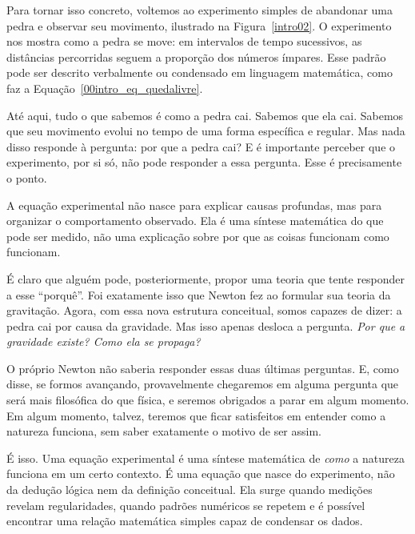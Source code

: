 Para tornar isso concreto, voltemos ao experimento simples de abandonar uma pedra e observar seu movimento, ilustrado na Figura~\ref{intro02}. O experimento nos mostra como a pedra se move: em intervalos de tempo sucessivos, as distâncias percorridas seguem a proporção dos números ímpares. Esse padrão pode ser descrito verbalmente ou condensado em linguagem matemática, como faz a Equação~\eqref{00intro_eq_quedalivre}.

Até aqui, tudo o que sabemos é como a pedra cai. Sabemos que ela cai. Sabemos que seu movimento evolui no tempo de uma forma específica e regular. Mas nada disso responde à pergunta: por que a pedra cai? E é importante perceber que o experimento, por si só, não pode responder a essa pergunta. Esse é precisamente o ponto.

A equação experimental não nasce para explicar causas profundas, mas para organizar o comportamento observado. Ela é uma síntese matemática do que pode ser medido, não uma explicação sobre por que as coisas funcionam como funcionam.


É claro que alguém pode, posteriormente, propor uma teoria que tente responder a esse “porquê”. Foi exatamente isso que Newton fez ao formular sua teoria da gravitação. Agora, com essa nova estrutura conceitual, somos capazes de dizer: a pedra cai por causa da gravidade. Mas isso apenas desloca a pergunta. \textit{Por que a gravidade existe? Como ela se propaga? } 

O próprio Newton não saberia responder essas duas últimas perguntas. E, como disse, se formos avançando, provavelmente chegaremos em alguma pergunta que será mais filosófica do que física, e seremos obrigados a parar em algum momento. Em algum momento, talvez, teremos que ficar satisfeitos em entender como a natureza funciona, sem saber exatamente o motivo de ser assim.

É isso. Uma equação experimental é uma síntese matemática de \textit{como} a natureza funciona em um certo contexto. É uma equação que nasce do experimento, não da dedução lógica nem da definição conceitual. Ela surge quando medições revelam regularidades, quando padrões numéricos se repetem e é possível encontrar uma relação matemática simples capaz de condensar os dados.








